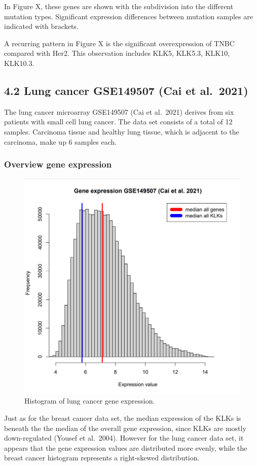 \documentclass[
]{article}
\begin{document}
In Figure X, these genes are shown with the subdivision into the
different mutation types. Significant expression differences between
mutation samples are indicated with brackets.

A recurring pattern in Figure X is the significant overexpression of
TNBC compared with Her2. This observation includes KLK5, KLK5.3, KLK10,
KLK10.3.

\hypertarget{lung-cancer-gse149507-cai-et-al.-2021}{%
\subsection{4.2 Lung cancer GSE149507 (Cai et
al.~2021)}\label{lung-cancer-gse149507-cai-et-al.-2021}}

The lung cancer microarray GSE149507 (Cai et al.~2021) derives from six
patients with small cell lung cancer. The data set consists of a total
of 12 samples. Carcinoma tissue and healthy lung tissue, which is
adjacent to the carcinoma, make up 6 samples each.

\hypertarget{overview-gene-expression-1}{%
\subsubsection{Overview gene
expression}\label{overview-gene-expression-1}}

\begin{figure}

{\centering \includegraphics[width=0.5\linewidth]{images/Histogram_lung} 

}

\caption{Histogram of lung cancer gene expression.}\label{fig:Histogram - lung }
\end{figure}

Just as for the breast cancer data set, the median expression of the
KLKs is beneath the the median of the overall gene expression, since
KLKs are mostly down-regulated (Yousef et al.~2004). However for the
lung cancer data set, it appears that the gene expression values are
distributed more evenly, while the breast cancer histogram represents a
right-skewed distribution.
\end{document}
